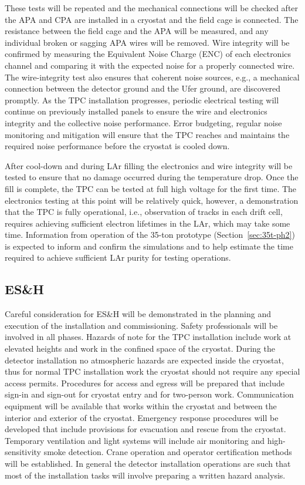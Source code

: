 These tests will be repeated and the mechanical connections will be checked after the APA and CPA are installed in a cryostat and the field cage is connected. The resistance between the field cage and the APA will be measured, 
and any individual broken or sagging APA wires will be removed. Wire integrity will be confirmed by measuring the Equivalent Noise Charge (ENC) of each electronics channel and comparing it with the expected noise for a 
properly connected wire. The wire-integrity test also ensures that coherent noise sources, e.g., a mechanical connection between the detector ground and the Ufer ground, are discovered promptly. As the TPC installation progresses, periodic electrical testing will continue on previously installed panels to ensure the wire 
and electronics integrity and the collective noise performance. Error budgeting, regular noise monitoring and mitigation will ensure that the TPC reaches and maintains the required noise performance before the cryostat is 
cooled down. 

After cool-down and during LAr filling the electronics and wire integrity will be tested to ensure that no damage occurred during the temperature drop. Once the fill is complete, the TPC can be tested at full high voltage for the 
first time. The electronics testing at this point will be relatively quick, however, a demonstration that the TPC is fully operational, i.e., observation of tracks in each drift cell, requires achieving sufficient electron lifetimes in the 
LAr, which may take some time. Information from operation of the 35-ton prototype (Section~\ref{sec:35t-ph2}) is expected to inform and confirm the simulations and to help estimate the time required to achieve sufficient LAr purity for testing operations. 


\subsection{ES\&H}
\label{fd:install:esh}

Careful consideration for ES\&H will be demonstrated in the planning and execution of the installation and commissioning. Safety professionals will be involved in all phases. Hazards of note for the TPC installation 
include work at elevated heights and work in the confined space of the cryostat. During the detector installation no atmospheric hazards are expected inside the cryostat, thus for normal TPC installation work the cryostat 
should not require any special access permits. Procedures for access and egress will be prepared that include sign-in and sign-out for cryostat entry and for two-person work. Communication equipment will be available that 
works within the cryostat and between the interior and exterior of the cryostat. Emergency response procedures will be developed that include provisions for evacuation and rescue from the cryostat. Temporary ventilation and 
light systems will include air monitoring and high-sensitivity smoke detection. Crane operation and operator certification methods will be established. In general the detector installation operations are such that most of the installation tasks will involve preparing a written hazard analysis. 
